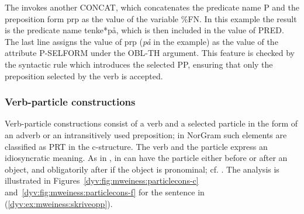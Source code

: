 \documentclass[output=paper]{langsci/langscibook}
\begin{document}
The  invokes another  \textsf{CONCAT}, which concatenates the predicate name P and the preposition form \textsf{prp} as the value of the variable \textsf{\%FN}.
In this example the result is the predicate name \textsf{tenke*på}, which is then included in the value of \textsf{PRED}.
The last line assigns the value of \textsf{prp} (\textit{på} in the example) as the value of the attribute \textsf{P-SELFORM} under the \textsf{OBL-TH} argument.
This feature is checked by the syntactic rule which introduces the selected \textsf{PP}, ensuring that only the preposition selected by the verb is accepted.




\subsubsection{Verb-particle constructions}\label{dyv:sec:mweiness:prtverbs}

Verb-particle constructions consist of a verb and a selected particle in the form of an adverb or an intransitively used preposition; in NorGram such elements are classified as \textsf{PRT} in the c-structure.
The verb and the particle express an idiosyncratic meaning.
As in ,  in  can have the particle either before or after an object, and obligatorily after if the object is pronominal; cf. \cite[276]{baldwin10}.
The analysis is illustrated in Figures~\ref{dyv:fig:mweiness:particlecons-c} and~\ref{dyv:fig:mweiness:particlecons-f} for the sentence in (\ref{dyv:ex:mweiness:skriveopp}).
\end{document}
